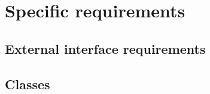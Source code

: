 \section{Specific requirements}
\vp


\subsection{External interface requirements}


\subsection{Classes}
\lstset{language=C++} %

\subsubsection{\code{\cs/}}

\begin{codes}

\end{codes}

\begin{codes}

\end{codes}

\subsubsection{}

\begin{codes}

\end{codes}

\begin{codes}

\end{codes}

\begin{codes}

\end{codes}

\begin{codes}

\end{codes}

